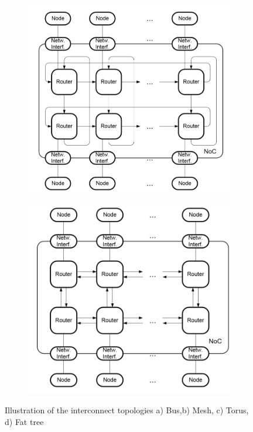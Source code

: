 \documentclass[journal,10pt,twoside, a4paper]{IEEEtran}
\begin{document}
\begin{figure}
\begin{subfigure}[b]{.475\textwidth}
            \includegraphics[width=\textwidth]{torus.png}
            \caption[]%
            {{\small }}    
            \label{ov2}
        \end{subfigure}
        \hfill
        \begin{subfigure}[b]{.475\textwidth}  
            \centering 
            \includegraphics[width=\textwidth]{mesh.png}
            \caption[]%
            {{\small }}    
            \label{ov2}
        \end{subfigure}

        
        \caption[ The average and standard deviation of critical parameters ]
        {\small Illustration of the interconnect topologies a) Bus,b) Mesh, c) Torus, d) Fat tree} 
        \label{fig:illustration}
\end{figure}
\end{document}
